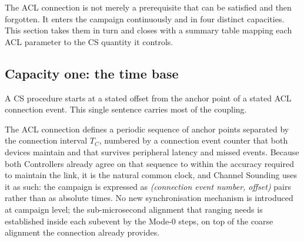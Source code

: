 \documentclass[11pt,a4paper]{article}
\newcommand{\Tconn}{T_{C}}
\begin{document}
The ACL connection is not merely a prerequisite that can be satisfied and then forgotten. It enters
the campaign continuously and in four distinct capacities. This section takes them in turn and closes
with a summary table mapping each ACL parameter to the CS quantity it controls.

\subsection{Capacity one: the time base}
\label{sec:acl-timebase}

A CS procedure starts at a stated offset from the anchor point of a stated ACL connection event. This
single sentence carries most of the coupling.

The ACL connection defines a periodic sequence of anchor points separated by the connection interval
$\Tconn$, numbered by a connection event counter that both devices maintain and that survives
peripheral latency and missed events. Because both Controllers already agree on that sequence to
within the accuracy required to maintain the link, it is the natural common clock, and Channel
Sounding uses it as such: the campaign is expressed as \emph{(connection event number, offset)} pairs
rather than as absolute times. No new synchronisation mechanism is introduced at campaign level; the
sub-microsecond alignment that ranging needs is established inside each subevent by the Mode-0 steps,
on top of the coarse alignment the connection already provides.
\end{document}
